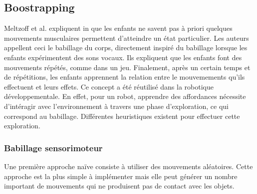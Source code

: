 \documentclass{llncs}
\begin{document}


\subsection{Boostrapping}

Meltzoff et al. expliquent in \cite{EDP:EDP157} que les enfants ne savent pas à priori quelques mouvements musculaires permettent d'atteindre un état particulier. Les auteurs appellent ceci le babillage du corps, directement inspiré du babillage lorsque les enfants expérimentent des sons vocaux. Ils expliquent que les enfants font des mouvements répétés, comme dans un jeu. Finalement, après un certain temps et de répétitions, les enfants apprennent la relation entre le mouvemements qu'ils effectuent et leurs effets. Ce concept a été réutilisé dans la robotique développementale. En effet, pour un robot, apprendre des affordances nécessite d'intéragir avec l'environnement à travers une phase d'exploration, ce qui correspond au babillage. Différentes heuristiques existent pour effectuer cette exploration.



\subsubsection{Babillage sensorimoteur}
Une première approche naïve consiste à utiliser des mouvements aléatoires. Cette approche est la plus simple à implémenter mais elle peut générer un nombre important de mouvements qui ne produisent pas de contact avec les objets.
\end{document}
